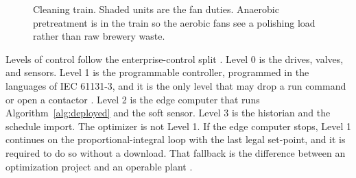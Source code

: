 \begin{figure}[ht]
\centering
{}
\caption{Cleaning train. Shaded units are the fan duties. Anaerobic pretreatment is in the train so the aerobic fans see a polishing load rather than raw brewery waste.}
\label{fig:train}
\end{figure}

Levels of control follow the enterprise-control split \cite{isa95}. Level 0 is the drives, valves, and sensors. Level 1 is the programmable controller, programmed in the languages of IEC 61131-3, and it is the only level that may drop a run command or open a contactor \cite{iec61131}. Level 2 is the edge computer that runs Algorithm~\ref{alg:deployed} and the soft sensor. Level 3 is the historian and the schedule import. The optimizer is not Level 1. If the edge computer stops, Level 1 continues on the proportional-integral loop with the last legal set-point, and it is required to do so without a download. That fallback is the difference between an optimization project and an operable plant \cite{obrien2011,olsson2012ica,iratni2019}.

